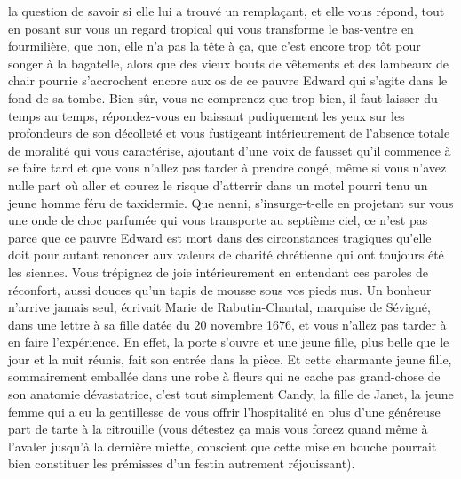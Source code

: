 la question de savoir si elle lui a trouvé un remplaçant, et elle vous répond, tout en posant sur vous un regard tropical qui vous transforme le bas-ventre en fourmilière, que non, elle n’a pas la tête à ça, que c’est encore trop tôt pour songer à la bagatelle, alors que des vieux bouts de vêtements et des lambeaux de chair pourrie s’accrochent encore aux os de ce pauvre Edward qui s’agite dans le fond de sa tombe. Bien sûr, vous ne comprenez que trop bien, il faut laisser du temps au temps, répondez-vous en baissant pudiquement les yeux sur les profondeurs de son décolleté et vous fustigeant intérieurement de l’absence totale de moralité qui vous caractérise, ajoutant d’une voix de fausset qu’il commence à se faire tard et que vous n’allez pas tarder à prendre congé, même si vous n’avez nulle part où aller et courez le risque d’atterrir dans un motel pourri tenu un jeune homme féru de taxidermie. Que nenni, s’insurge-t-elle en projetant sur vous une onde de choc parfumée qui vous transporte au septième ciel, ce n’est pas parce que ce pauvre Edward est mort dans des circonstances tragiques qu’elle doit pour autant renoncer aux valeurs de charité chrétienne qui ont toujours été les siennes. Vous trépignez de joie intérieurement en entendant ces paroles de réconfort, aussi douces qu’un tapis de mousse sous vos pieds nus. Un bonheur n’arrive jamais seul, écrivait Marie de Rabutin-Chantal, marquise de Sévigné, dans une lettre à sa fille datée du 20 novembre 1676, et vous n’allez pas tarder à en faire l’expérience. En effet, la porte s’ouvre et une jeune fille, plus belle que le jour et la nuit réunis, fait son entrée dans la pièce. Et cette charmante jeune fille, sommairement emballée dans une robe à fleurs qui ne cache pas grand-chose de son anatomie dévastatrice, c’est tout simplement Candy, la fille de Janet, la jeune femme qui a eu la gentillesse de vous offrir l’hospitalité en plus d’une généreuse part de tarte à la citrouille (vous détestez ça mais vous forcez quand même à l’avaler jusqu’à la dernière miette, conscient que cette mise en bouche pourrait bien constituer les prémisses d’un festin autrement réjouissant).

